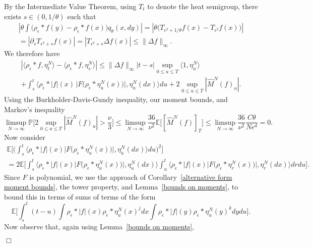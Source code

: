 \documentclass[12pt]{article}
\newenvironment {proof}{{\noindent\bf Proof }}{\hfill $\Box$ \medskip}
\newcommand{\IP}{\mathbb P}
\newcommand{\IE}{\mathbb E}
\numberwithin{equation}{section}
\begin{document}
\begin{proof}
By the Intermediate Value Theorem, using $T_t$ to denote the heat semigroup,
there exists $s\in (0,1/\theta)$ such that
\begin{multline*}
\left|
\theta\int\big(\rho_\epsilon*f(y)-\rho_\epsilon*f(x)\big)
q_{\theta}(x,dy) \right|
=
\left|\theta\Big(T_{\epsilon^2+1/\theta}f(x)-T_{\epsilon^2}f(x)\Big)\right|
\\
=
\left|\partial_sT_{\epsilon^2+s}f(x)\right|=\left|T_{\epsilon^2+s}\Delta f(x)\right|
\leq\|\Delta f\|_\infty.
\end{multline*}
We therefore have
\begin{multline*}
        \left|
        \langle \rho_{\epsilon} * f, \eta_t^N \rangle
        -
        \langle \rho_{\epsilon} * f, \eta_s^N \rangle
        \right|
        \leq
        \| \Delta f \|_\infty |t-s|
        \sup_{0 \leq u \leq T } \langle 1, \eta_u^N \rangle
\\
+
	\int_s^t
	\big\langle \rho_\epsilon*|f|(x)\, \big|F\big(\rho_\epsilon*\eta_u^N(x)\big)\big|,
\eta_u^N(dx)\big\rangle du +2\sup_{0\leq u\leq T}|\widehat{M}^N(f)_u|.
    \end{multline*}
Using the Burkholder-Davis-Gundy inequality, our
moment bounds, and Markov's inequality
\begin{equation}
\label{martingale term to zero}
\limsup_{N\to\infty}\IP\Big[
2\sup_{0\leq u\leq T}|\widehat{M}^N(f)_u|
>\frac{\nu}{3}
\Big]\leq \limsup_{N\to\infty}\frac{36}{\nu^2}\IE\big[[\widehat{M}^N(f)]_T\big]
\leq \limsup_{N\to\infty}\frac{36}{\nu^2}\frac{C\theta}{N\epsilon^d} 
=0. 
\end{equation}
Now consider
\begin{multline}
	\label{square of F-integral}
\IE\Big[
	\Big(\int_s^t\big\langle\rho_\epsilon*|f|(x) \big|F\big(\rho_\epsilon*\eta_u^N(x)\big)\big|,
\eta_u^N(dx)\big\rangle du\Big)^2\Big]
\\
=
2\IE\Big[
	\int_s^t\big\langle\rho_\epsilon*|f|(x) \big|F\big(\rho_\epsilon*\eta_u^N(x)\big)\big|,
\eta_u^N(dx)\big\rangle 
	\int_u^t\big\langle \rho_\epsilon*|f|(x)\big|F\big(\rho_\epsilon*\eta_r^N(x)\big)\big|,
\eta_r^N(dx)\big\rangle dr
du\Big].
\end{multline}
Since $F$ is polynomial, we use the approach
of Corollary~\ref{alternative form moment bounds}, the tower 
property, and 
Lemma~\ref{bounds on moments}, to bound this
in terms of sums of terms of the form
\[
\IE\Big[\int_s^t(t-u)\int\rho_\epsilon*|f|(x)\rho_\epsilon*\eta_u^N(x)^jdx
\int\rho_\epsilon*|f|(y)\rho_\epsilon*\eta_u^N(y)^kdydu\Big].
\]
Now observe that, again using Lemma~\ref{bounds on moments}, 

\end{proof}
\end{document}
